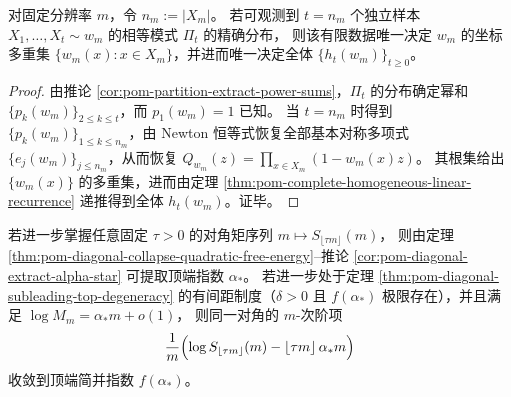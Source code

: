 \begin{theorem}[有限样本相等模式 \texorpdfstring{$\Rightarrow$}{=>} 全恢复曲线]\label{thm:pom-closure-partition-to-full-recovery-curve}
对固定分辨率 \(m\)，令 \(n_m:=|X_m|\)。
若可观测到 \(t=n_m\) 个独立样本 \(X_1,\dots,X_t\sim w_m\) 的相等模式 \(\Pi_t\) 的精确分布，
则该有限数据唯一决定 \(w_m\) 的坐标多重集 \(\{w_m(x):x\in X_m\}\)，并进而唯一决定全体 \(\{h_t(w_m)\}_{t\ge0}\)。
\end{theorem}
\begin{proof}
由推论 \ref{cor:pom-partition-extract-power-sums}，\(\Pi_t\) 的分布确定幂和 \(\{p_k(w_m)\}_{2\le k\le t}\)，而 \(p_1(w_m)=1\) 已知。
当 \(t=n_m\) 时得到 \(\{p_k(w_m)\}_{1\le k\le n_m}\)，由 Newton 恒等式恢复全部基本对称多项式 \(\{e_j(w_m)\}_{j\le n_m}\)，从而恢复 \(Q_{w_m}(z)=\prod_{x\in X_m}(1-w_m(x)z)\)。
其根集给出 \(\{w_m(x)\}\) 的多重集，进而由定理 \ref{thm:pom-complete-homogeneous-linear-recurrence} 递推得到全体 \(h_t(w_m)\)。证毕。
\end{proof}

\begin{theorem}[对角矩 \texorpdfstring{$\Rightarrow$}{=>} 顶端谱]\label{thm:pom-closure-diagonal-to-top-spectrum}
若进一步掌握任意固定 \(\tau>0\) 的对角矩序列 \(m\mapsto S_{\lfloor\tau m\rfloor}(m)\)，
则由定理 \ref{thm:pom-diagonal-collapse-quadratic-free-energy}--推论 \ref{cor:pom-diagonal-extract-alpha-star} 可提取顶端指数 \(\alpha_\ast\)。
若进一步处于定理 \ref{thm:pom-diagonal-subleading-top-degeneracy} 的有间距制度（\(\delta>0\) 且 \(f(\alpha_\ast)\) 极限存在），并且满足 \(\log M_m=\alpha_\ast m+o(1)\)，
则同一对角的 \(m\)-次阶项
\[
\frac{1}{m}\Bigl(\log S_{\lfloor\tau m\rfloor}(m)-\lfloor\tau m\rfloor\,\alpha_\ast m\Bigr)
\]
收敛到顶端简并指数 \(f(\alpha_\ast)\)。
\end{theorem}
